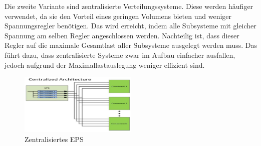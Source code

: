  Die zweite Variante sind zentralisierte Verteilungssysteme. Diese werden häufiger verwendet, da sie den Vorteil eines geringen Volumens bieten und weniger Spannungsregler benötigen. Das wird erreicht, indem alle Subsysteme mit gleicher Spannung am selben Regler angeschlossen werden. Nachteilig ist, dass dieser Regler auf die maximale Gesamtlast aller Subsysteme ausgelegt werden muss. Das führt dazu, dass zentralisierte Systeme zwar im Aufbau einfacher ausfallen, jedoch aufgrund der Maximallastauslegung weniger effizient sind.\cite{Abaker.2017}
\begin{figure}[!h]
	\centering
		\includegraphics[width=0.50\textwidth]{./graphics/Centralized_EPS.PNG}
	\caption{Zentralisiertes EPS \cite{Abaker.2017}}
\end{figure}




